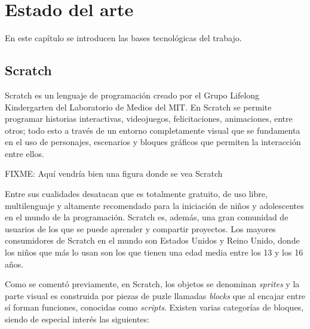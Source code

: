 \documentclass[a4paper, 12pt]{book}
\begin{document}

\cleardoublepage
\chapter{Estado del arte}
\label{chap:estado}

En este capítulo se introducen las bases tecnológicas del trabajo.

\section{Scratch}
\label{sec:Scratch}

Scratch es un lenguaje de programación creado por el Grupo Lifelong Kindergarten del Laboratorio de Medios del MIT. En Scratch se permite programar historias interactivas, videojuegos, felicitaciones, animaciones, entre otros; todo esto a través de un entorno completamente visual que se fundamenta en el uso de personajes, escenarios y bloques gráficos que permiten la interacción entre ellos.

FIXME: Aquí vendría bien una figura donde se vea Scratch

Entre sus cualidades desatacan que es totalmente gratuito, de uso libre, multilenguaje y altamente recomendado para la iniciación de niños y adolescentes en el mundo de la programación. Scratch es, además, una gran comunidad de usuarios de los que se puede aprender y compartir proyectos. Los mayores consumidores de Scratch en el mundo son Estados Unidos y Reino Unido, donde los niños que más lo usan son los que tienen una edad media entre los 13 y los 16 años.

Como se comentó previamente, en Scratch, los objetos se denominan \textit{sprites} y la parte visual es construida por piezas de puzle llamadas \textit{blocks} que al encajar entre sí forman funciones, conocidas como \textit{scripts}. Existen varias categorías de bloques, siendo de especial interés las siguientes: 
\end{document}

